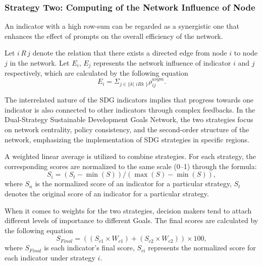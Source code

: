 \documentclass[12pt]{article}  %
\begin{document}
\subsubsection{Strategy Two: Computing of the Network Influence of Node}


An indicator with a high row-sum can be regarded as a synergistic one that enhances the effect of prompts on the overall efficiency of the network.

Let $i \,R \,j$ denote the relation that there exists a directed edge from node $i$ to node $j$ in the network.
Let $E_i$, $E_j$ represents the network influence  of indicator $i$ and $j$ respectively, which are calculated by the following equation
\begin{equation}
    E_i=\Sigma_{j\in \{k|\,\,iRk\,\,\}}\rho_{ij}^{asym}.
\end{equation}

The interrelated nature of the SDG indicators implies that progress towards one indicator is also connected to other indicators through complex feedbacks. 
In the Dual-Strategy Sustainable Development Goals Network, the two strategies focus on network centrality, policy consistency, and the second-order structure of the network, emphasizing the implementation of SDG strategies in specific regions.


A weighted linear average is utilized to combine strategies. For each strategy, the 
corresponding scores are normalized to the same scale (0–1) through the formula:
\begin{equation}
    S_i=(S_t-\min(S))/(\max (S)-\min (S)),
\end{equation}
where $S_n$ is the normalized score of an indicator for a particular strategy, $S_t$ denotes the original score of an indicator for a particular strategy.

When it comes to weights for the two strategies, decision makers tend to attach different levels of importance to different Goals. The final scores are calculated by the following equation
\begin{equation}
    S_{Final}=((S_{c1}\times W_{c1})+(S_{c2}\times W_{c2}))\times 100,
\end{equation}
where $S_{Final}$ is each indicator's final score, $S_{ci}$ represents the normalized score for  each indicator under strategy $i$. 
\end{document}
